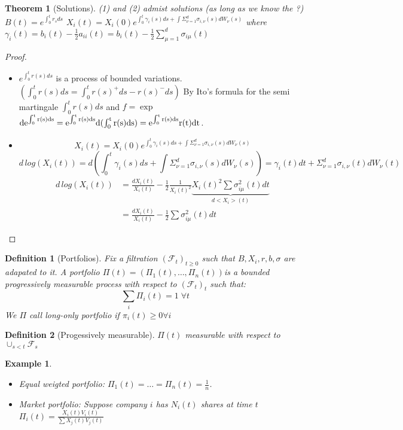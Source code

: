 \documentclass{article} \usepackage[utf8]{inputenc}
\newtheorem{theorem}{Theorem}
\newtheorem{definition}{Definition}
\newtheorem{example}{Example}
\begin{document}
\begin{theorem}[Solutions]
  (1) and (2) admist solutions (as long as we know the ?)
  $B(t) = e^{\int_0^t r_s ds}$
  $X_i(t) = X_i(0) e^{\int_0^t \gamma_i(s) ds + \int \Sigma_{\nu=1}^d \sigma_{i,\nu}(s) dW_{\nu}(s)}$
  where $\gamma_i(t) = b_i(t) - \frac12 a_{ii}(t) = b_i(t) - \frac12 \sum_{\mu=1}^d \sigma_{i\mu}(t)$
\end{theorem}
\begin{proof}
  \begin{itemize}
  \item $e^{\int_0^t r(s) ds}$ is a process of bounded variations.
    $( \int_0^t r(s)ds = \int_0^t r(s)^+ds - r(s)^-ds )$ By Ito's
    formula for the semi martingale $\int_0^t r(s)ds$ and $f = \exp$
    $\rm de^{\int_0^t r(s)\rm ds} = e^{\int_0^t r(s)\rm ds} \rm
    d(\int_0^t r(s) \rm ds) = e^{\int_0^t r(s)\rm ds} r(t) dt$.
  \item 
    $$X_i(t) = X_i(0) e^{\int_0^t \gamma_i(s) ds + \int \Sigma_{\nu=1}^d \sigma_{i,\nu}(s) dW_{\nu}(s)}$$
    $$d \, log(X_i(t)) = d(\int_0^t \gamma_i(s) ds + \int \Sigma_{\nu=1}^d \sigma_{i,\nu}(s) dW_{\nu}(s)) = \gamma_i(t) dt + \Sigma_{\nu=1}^d \sigma_{i,\nu}(t) dW_{\nu}(t)$$
    \begin{align*}
      d \, log(X_i(t)) &= \frac{dX_i(t)}{X_i(t)} - \frac12 \frac1{X_i(t)^2} \underbrace{X_i(t)^2 \sum \sigma_{i\mu}^2(t) dt}_{d<X_i>(t)}\\
                       &= \frac{dX_i(t)}{X_i(t)} - \frac12 \sum \sigma_{i\mu}^2(t) dt
    \end{align*}

  \end{itemize}

\end{proof}

\begin{definition}[Portfolios]
  Fix a filtration $(\mathcal F_t)_{t \ge 0}$ such that $B, X_i, r, b, \sigma$ are adapated to it.
  A portfolio $\Pi(t) = (\Pi_1(t), \ldots, \Pi_n(t))$is a bounded progressively measurable process with respect to $(\mathcal F_t)_t$ such that:
  $$\sum_i \Pi_i(t) = 1 \; \forall t$$
  We $\Pi$ call long-only portfolio if $\pi_i(t) \ge 0 \forall i$ 
\end{definition}
\begin{definition}[Progessively measurable]
  $\Pi(t)$ measurable with respect to $\cup_{s < t} \mathcal F_s$
\end{definition}
\begin{example}
  \begin{itemize}
  \item Equal weigted portfolio: $\Pi_1(t) = \ldots = \Pi_n(t) = \frac1n$.
  \item Market portfolio: Suppose company $i$ has $N_i(t)$ shares at time $t$
    $\Pi_i(t) = \frac{X_i(t)V_i(t)}{\sum X_j(t)V_j(t)}$
  \end{itemize}
\end{example}
\end{document}
